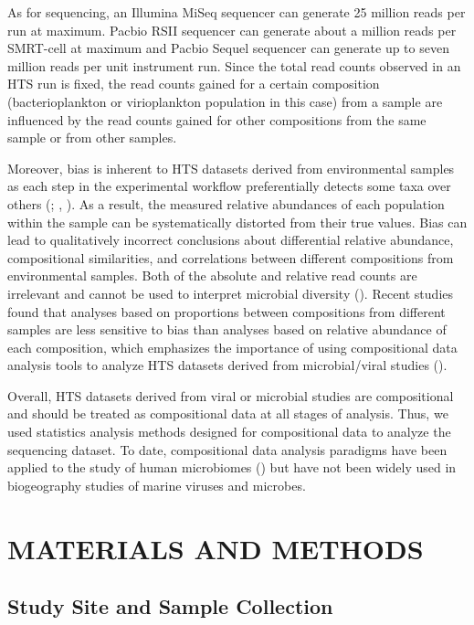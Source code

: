 \documentclass[a4,center,fleqn]{NAR}
\begin{document}
As for sequencing, an Illumina MiSeq sequencer can generate 25 million reads per run at maximum. 
Pacbio RSII sequencer can generate about a million reads per SMRT-cell at maximum and Pacbio Sequel sequencer can generate up to seven million reads per unit instrument run. 
Since the total read counts observed in an HTS run is fixed, the read counts gained for a certain composition (bacterioplankton or virioplankton population in this case) from a sample are influenced by the read counts gained for other compositions from the same sample or from other samples. 


Moreover, bias is inherent to HTS datasets derived from environmental samples as each step in the experimental workflow preferentially detects some taxa over others (\cite{Brooks:2015aa}; \cite{Sinha:2017aa}, \cite{BROOKS2016336}). 
As a result, the measured relative abundances of each population within the sample can be systematically distorted from their true values. 
Bias can lead to qualitatively incorrect conclusions about differential relative abundance, compositional similarities, and correlations between different compositions from environmental samples.
Both of the absolute and relative read counts are irrelevant and cannot be used to interpret microbial diversity (\cite{Gloor2017}).
Recent studies found that analyses based on proportions between compositions from different samples are less sensitive to bias than analyses based on relative abundance of each composition, which emphasizes the importance of using compositional data analysis tools to analyze HTS datasets derived from microbial/viral studies (\cite{McLaren2019}).

Overall, HTS datasets derived from viral or microbial studies are compositional and should be treated as compositional data at all stages of analysis. 
Thus, we used statistics analysis methods designed for compositional data to analyze the sequencing dataset. 
To date, compositional data analysis paradigms have been applied to the study of human microbiomes (\cite{Bian2017}) but have not been widely used in biogeography studies of marine viruses and microbes. 


\section{MATERIALS AND METHODS}

\subsection{Study Site and Sample Collection}
\end{document}
